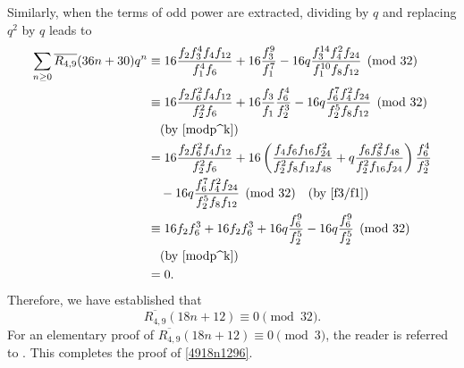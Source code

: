 \documentclass{amsart}
\theoremstyle{definition}
\begin{document}
Similarly, when the terms of odd power are extracted, dividing by $q$ and replacing $q^2$ by $q$ leads to
\begin{align*}
		\sum_{n \ge 0} \overline{R_{4,9}}(36n+30) q^n 
		&\equiv 16 \frac{f_2 f_3^4 f_4 f_{12}}{f_1^4 f_6} + 16 \frac{f_3^9}{f_1^7} - 16q \frac{f_3^{14} f_4^2 f_{24}}{f_1^{10} f_8 f_{12}} \pmod{32} \\
		&\equiv 16 \frac{f_2 f_6^2 f_4 f_{12}}{f_2^2 f_6} + 16 \frac{f_3}{f_1} \frac{f_6^4}{f_2^3} - 16q \frac{f_6^7 f_4^2 f_{24}}{f_2^5 f_8 f_{12}} \pmod{32} \\
		&\quad \text{(by \eqref{modp^k})} \\
		&= 16 \frac{f_2 f_6^2 f_4 f_{12}}{f_2^2 f_6} + 16 \left( \frac{f_4 f_6 f_{16} f_{24}^2}{f_2^2 f_8 f_{12} f_{48}} + q \frac{f_6 f_8^2 f_{48}}{f_2^2 f_{16} f_{24}} \right) \frac{f_6^4}{f_2^3} \\
		&\quad - 16q \frac{f_6^7 f_4^2 f_{24}}{f_2^5 f_8 f_{12}} \pmod{32} \quad \text{(by \eqref{f3/f1})} \\
		&\equiv 16 f_2 f_6^3 + 16 f_2 f_6^3 + 16q \frac{f_6^9}{f_2^5} - 16q \frac{f_6^9}{f_2^5} \pmod{32} \\
		&\quad \text{(by \eqref{modp^k})} \\
		&= 0.
\end{align*}
Therefore, we have established that
\begin{equation*}
	\overline{R_{4,9}}(18n+12)\equiv 0 \pmod{32}.
\end{equation*}
For an elementary proof of $\overline{R_{4,9}}(18n+12)\equiv 0 \pmod{3}$, the reader is referred to \cite[Theorem 5.2]{Ghoshal-Jana}. This completes the proof of \eqref{4918n1296}.
\end{document}
